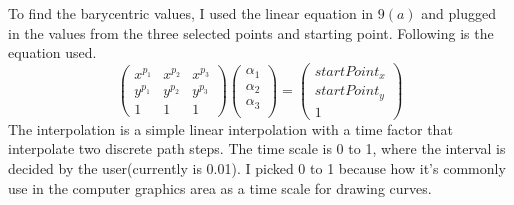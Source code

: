 \documentclass{article}
\begin{document}
To find the barycentric values, I used the linear equation in $9(a)$ and plugged in the values from the three selected points and starting point. Following is the equation used.
\begin{equation*}
\begin{pmatrix}
x^{p_1} & x^{p_2} & x^{p_3} \\
y^{p_1} & y^{p_2} & y^{p_3} \\
1 & 1 & 1 
\end{pmatrix}
\begin{pmatrix}
\alpha_1 \\
\alpha_2 \\
\alpha_3 \\ 
\end{pmatrix}
=
\begin{pmatrix}
startPoint_x \\
startPoint_y \\
1 
\end{pmatrix}
\end{equation*}
The interpolation is a simple linear interpolation with a time factor that interpolate two discrete path steps. The time scale is 0 to 1, where the interval is decided by the user(currently is 0.01). I picked 0 to 1 because how it's commonly use in the computer graphics area as a time scale for drawing curves.
\end{document}

